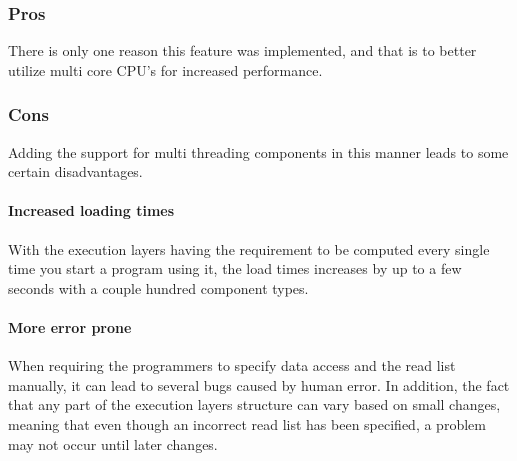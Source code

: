 \subsubsection{Pros}
There is only one reason this feature was implemented, and that is to better utilize multi core CPU's for increased performance.

\subsubsection{Cons}
Adding the support for multi threading components in this manner leads to some certain disadvantages.

\paragraph{Increased loading times}
With the execution layers having the requirement to be computed every single time you start a program using it, the load times increases by up to a few seconds with a couple hundred component types.

\paragraph{More error prone}
When requiring the programmers to specify data access and the read list manually, it can lead to several bugs caused by human error.
In addition, the fact that any part of the execution layers structure can vary based on small changes, meaning that even though an incorrect read list has been specified, a problem may not occur until later changes.
